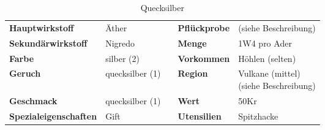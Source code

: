 \begin{table}[H] 
\begin{center} 
\begin{tabular}{|l|l|p{1cm}|l|l|} 
  	\cline{1-2} \cline{4-5} 
  	\textbf{Hauptwirkstoff} & Äther && \textbf{Pflückprobe} & (siehe Beschreibung) \\ \cline{1-2} \cline{4-5} 
  	\textbf{Sekundärwirkstoff} & Nigredo && \textbf{Menge} & 1W4 pro Ader \\ \cline{1-2} \cline{4-5} 
  	\textbf{Farbe} & silber (2) && \textbf{Vorkommen} & Höhlen (selten) \\ \cline{1-2} \cline{4-5} 
  	\textbf{Geruch} & quecksilber (1) && \textbf{Region} & \brcell{Vulkane (mittel) \\ (siehe Beschreibung)} \\ \cline{1-2} \cline{4-5} 
  	\textbf{Geschmack} & quecksilber (1) && \textbf{Wert} & 50Kr \\ \cline{1-2} \cline{4-5} 
  	\textbf{Spezialeigenschaften} & Gift && \textbf{Utensilien} & Spitzhacke \\ \cline{1-2} \cline{4-5} 
\end{tabular} 
\end{center} 
\caption{Quecksilber} 
\label{tab:quecksilber} 
\end{table}